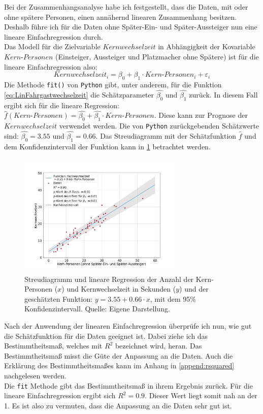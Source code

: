 Bei der Zusammenhangsanalyse habe ich festgestellt, dass die Daten, mit oder ohne spätere Personen, einen annähernd linearen Zusammenhang besitzen. Deshalb führe ich für die Daten ohne Später-Ein- und Später-Aussteiger nun eine lineare Einfachregression durch.\\
Das Modell für die Zielvariable $Kernwechselzeit$ in Abhängigkeit der Kovariable $Kern\text{-}Personen$ (Einsteiger, Aussteiger und Platzmacher ohne Spätere) ist für die lineare Einfachregression also:
\begin{equation}
Kernwechselzeit_i = \beta_0 + \beta_1 \cdot Kern\text{-}Personen_i + \varepsilon_i
\label{eq:LinFahrgastwechselzeit}
\end{equation} 
Die Methode \texttt{fit()} von \texttt{Python} gibt, unter anderem, für die Funktion \ref{eq:LinFahrgastwechselzeit} die Schätzparameter $\hat{\beta_0}$ und $\hat{\beta_1}$ zurück. In diesem Fall ergibt sich für die lineare Regression: $\hat{f}(Kern\text{-}Personen) = \hat{\beta_0} + \hat{\beta_1} \cdot Kern\text{-}Personen$. Diese kann zur Prognose der $Kernwechselzeit$ verwendet werden.
Die von \texttt{Python} zurückgebenden Schätzwerte sind: $\hat{\beta_0}=3.55$ und $\hat{\beta_1}=0.66$. Das Streudiagramm mit der Schätzfunktion $\hat{f}$ und dem Konfidenzintervall der Funktion kann in \figurename \ref{fig:LinReg} betrachtet werden.
\begin{figure}[H]
	\centering
		\includegraphics[width=0.7\textwidth]{pictures/data_evaluation/transferTime/lin_core_transfer_time.png}
	\caption{Streudiagramm und lineare Regression der Anzahl der Kern-Personen ($x$) und Kernwechselzeit in Sekunden ($y$) und der geschätzten Funktion: $y = 3.55 + 0.66 \cdot x$, mit dem 95\% Konfidenzintervall. Quelle: Eigene Darstellung.}
	\label{fig:LinReg}
\end{figure}
Nach der Anwendung der linearen Einfachregression überprüfe ich nun, wie gut die Schätzfunktion für die Daten geeignet ist. Dabei ziehe ich das Bestimmtheitsmaß, welches mit $R^2$ bezeichnet wird, heran. Das Bestimmtheitsmaß misst die Güte der Anpassung an die Daten. Auch die Erklärung des Bestimmtheitsmaßes kann im Anhang in \ref{append:rsquared} nachgelesen werden. \\
Die \texttt{fit} Methode gibt das Bestimmtheitsmaß in ihrem Ergebnis zurück. Für die lineare Einfachregression ergibt sich $R^2=0.9$. Dieser Wert liegt somit nah an der 1. Es ist also zu vermuten, dass die Anpassung an die Daten sehr gut ist. 

